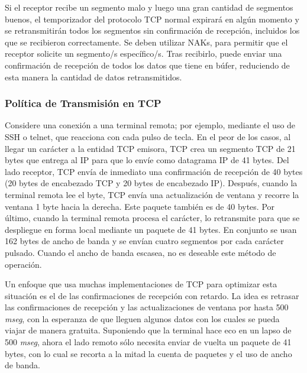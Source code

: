 \documentclass[10pt,a4paper]{report}
\begin{document}
	\par Si el receptor recibe un segmento malo y luego una gran cantidad de segmentos buenos, el temporizador del protocolo TCP normal expirará en algún momento y se retransmitirán todos los segmentos sin confirmación de recepción, incluidos los que se recibieron correctamente. Se deben utilizar NAKs, para permitir que el receptor solicite un segmento/s específico/s. Tras recibirlo, puede enviar una confirmación de recepción de todos los datos que tiene en búfer, reduciendo de esta manera la cantidad de datos retransmitidos.

\subsubsection{Política de Transmisión en TCP}

	\par Considere una conexión a una terminal remota; por ejemplo, mediante el uso de SSH o telnet, que reacciona con cada pulso de tecla. En el peor de los casos, al llegar un carácter a la entidad TCP emisora, TCP crea un segmento TCP de 21 bytes que entrega al IP para que lo envíe como datagrama IP de 41 bytes. Del lado receptor, TCP envía de inmediato una confirmación de recepción de 40 bytes (20 bytes de encabezado TCP y 20 bytes de encabezado IP). Después, cuando la terminal remota lee el byte, TCP envía una actualización de ventana y recorre la ventana 1 byte hacia la derecha. Este paquete también es de 40 bytes. Por último, cuando la terminal remota procesa el carácter, lo retransmite para que se despliegue en forma local mediante un paquete de 41 bytes. En conjunto se usan 162 bytes de ancho de banda y se envían cuatro segmentos por cada carácter pulsado. Cuando el ancho de banda escasea, no es deseable este método de operación.
	
	\par Un enfoque que usa muchas implementaciones de TCP para optimizar esta situación es el de las confirmaciones de recepción con retardo. La idea es retrasar las confirmaciones de recepción y las actualizaciones de ventana por hasta 500 \textit{mseg}, con la esperanza de que lleguen algunos datos con los cuales se pueda viajar de manera gratuita. Suponiendo que la terminal hace eco en un lapso de 500 \textit{mseg}, ahora el lado remoto sólo necesita enviar de vuelta un paquete de 41 bytes, con lo cual se recorta a la mitad la cuenta de paquetes y el uso de ancho de banda.
	
\end{document}
